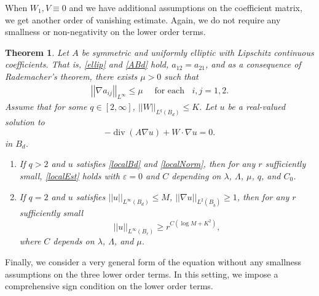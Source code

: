 \documentclass[12pt,reqno]{amsart}
\theoremstyle{plain}
\newtheorem{thm}{Theorem}
\theoremstyle{definition}
\DeclareMathOperator{\di}{div}
\newcommand{\eps}{\varepsilon}
\newcommand{\la}{\lambda}
\newcommand{\La}{\Lambda}
\newcommand{\iny}{\infty}
\newcommand{\gr}{\nabla}
\newcommand{\norm}[1]{\left\vert \left\vert #1\right\vert\right\vert}
\newcommand{\pr}[1]{\left( #1 \right) }
\begin{document}
When $W_1, V \equiv 0$ and we have additional assumptions on the coefficient matrix, we get another order of vanishing estimate.
Again, we do not require any smallness or non-negativity on the lower order terms.

\begin{thm}
\label{OofV2}
Let $A$ be symmetric and uniformly elliptic with Lipschitz continuous coefficients. 
That is, \eqref{ellip} and \eqref{ABd} hold, $a_{12} = a_{21}$, and as a consequence of Rademacher's theorem, there exists $\mu > 0$ such that
\begin{align}
\norm{\gr a_{ij}}_{L^\iny} \le \mu \quad \text{ for each } \;\; i, j = 1, 2.
\label{gradDec}
\end{align}
Assume that for some $q \in [2, \iny]$, $\norm{W}_{L^{q}\pr{B_d}} \le K$.
Let $u$ be a real-valued solution to 
\begin{equation}
- \di\pr{A \gr u} + W \cdot \gr u = 0.
\label{epde3}
\end{equation}
in $B_d$.
\begin{enumerate}
\item[{\rm (a)}] If $q > 2$ and $u$ satisfies \eqref{localBd} and \eqref{localNorm}, then for any $r$ sufficiently small, \eqref{localEst} holds with $\eps = 0$ and $C$ depending on $\la$, $\La$, $\mu$, $q$, and $C_0$.
\item[{\rm (b)}] If $q = 2$ and $u$ satisfies $\norm{u}_{L^\iny\pr{B_d}} \le M$, $\norm{\gr u}_{L^2\pr{B_{\tilde b}}} \ge 1$, then for any $r$ sufficiently small
\begin{equation}
\norm{u}_{L^\iny\pr{B_r}} \ge r^{C\pr{\log M + K^2}},
\label{localEst2}
\end{equation}
where $C$ depends on $\la$, $\La$, and $\mu$.
\end{enumerate}
\end{thm}

Finally, we consider a very general form of the equation without any smallness assumptions on the three lower order terms.
In this setting, we impose a comprehensive sign condition on the lower order terms.
\end{document}
